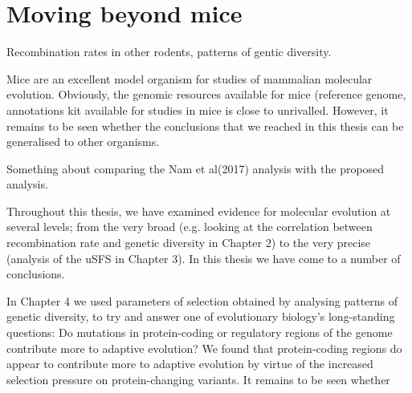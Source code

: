 \section{Moving beyond mice}

	Recombination rates in other rodents, patterns of gentic diversity.

Mice are an excellent model organism for studies of mammalian molecular evolution. Obviously, the genomic resources available for mice (reference genome, annotations  kit available for studies in mice is close to unrivalled. 
However, it remains to be seen whether the conclusions that we reached in this thesis can be generalised to other organisms. 

Something about comparing the Nam et al(2017) analysis with the proposed analysis.
 
Throughout this thesis, we have examined evidence for molecular evolution at several levels; from the very broad (e.g. looking at the correlation between recombination rate and genetic diversity in Chapter 2) to the very precise (analysis of the uSFS in Chapter 3). In this thesis we have come to a number of conclusions. 

In Chapter 4 we used parameters of selection obtained by analysing patterns of genetic diversity, to try and answer one of evolutionary biology's long-standing questions: Do mutations in protein-coding or regulatory regions of the genome contribute more to adaptive evolution? We found that protein-coding regions do appear to contribute more to adaptive evolution by virtue of the increased selection pressure on protein-changing variants. It remains to be seen whether 

